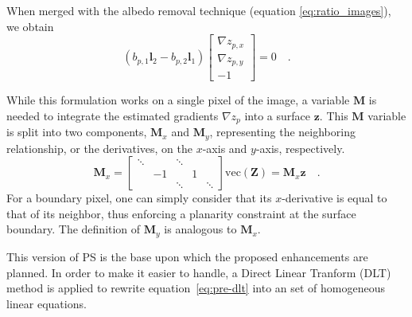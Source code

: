 When merged with the albedo removal technique (equation \eqref{eq:ratio_images}), we obtain
\begin{equation}
\label{eq:pre-dlt}
\left( b_{p,1} \mathbf{l}_2 - b_{p,2} \mathbf{l}_1 \right)
\begin{bmatrix}
\nabla z_{p,x} \\
\nabla z_{p,y} \\
-1
\end{bmatrix}
= 0  \quad.
\end{equation}

While this formulation works on a single pixel of the image, a variable $\mathbf{M}$ is needed to integrate the estimated gradients $\nabla z_p$ into a surface $\mathbf{z}$. This $\mathbf{M}$ variable is split into two components, $\mathbf{M}_x$ and $\mathbf{M}_y$, representing the neighboring relationship, or the derivatives, on the $x$-axis and $y$-axis, respectively.
\begin{equation}
\mathbf{M}_x = 
\begin{bmatrix}
\ddots &    & \ddots &   &        \\
       & -1 &        & 1 &        \\
       &    & \ddots &   & \ddots
\end{bmatrix}
\mathrm{vec}(\mathbf{Z}) = \mathbf{M}_x\mathbf{z}  \quad.
\end{equation}
For a boundary pixel, one can simply consider that its $x$-derivative is equal to that of its neighbor, thus enforcing a planarity constraint at the surface boundary. The definition of $\mathbf{M}_y$ is analogous to $\mathbf{M}_x$.

This version of PS is the base upon which the proposed enhancements are planned. In order to make it easier to handle, a Direct Linear Tranform (DLT) method is applied to rewrite equation~\eqref{eq:pre-dlt} into an set of homogeneous linear equations.

